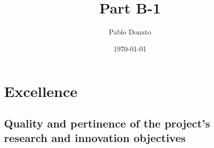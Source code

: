 \documentclass[12pt,draftproposal]{msca-pf}
\title{Part B-1}
\author{Pablo Donato}
\date{\today}
\begin{document}
\maketitle



\section{Excellence }
\label{sc:excellence}

\subsection{Quality and pertinence of the project's research and innovation objectives}
\label{ssc:excellence:quality}
\end{document}
